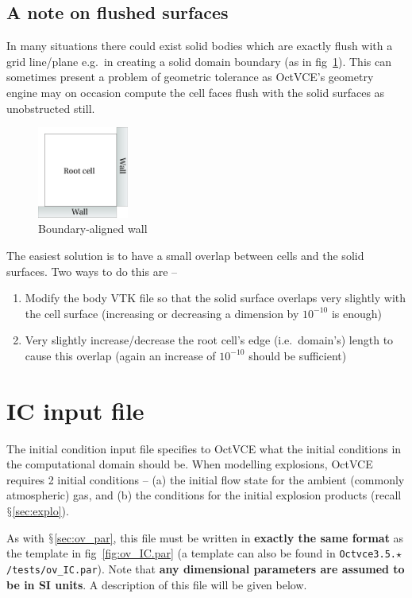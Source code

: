 \documentclass[pdftex, 12pt, a4paper]{report}
\begin{document}
\subsection{A note on flushed surfaces}\label{sec:grid_flush}

In many situations there could exist solid bodies which are exactly flush with a grid line/plane e.g.\ in creating
a solid domain boundary (as in fig~\ref{fig:boundary_wall}).  This can sometimes present a problem of geometric tolerance
as OctVCE's geometry engine may on occasion compute the cell faces flush with the solid surfaces as unobstructed still.

\begin{figure}[htp]
\centering
\includegraphics[width=3cm]{pics/flush_wall.jpg}
\caption{Boundary-aligned wall}
\label{fig:boundary_wall}
\end{figure}

The easiest solution is to have a small overlap between cells and the solid surfaces.  Two ways to do this are -- 
\begin{enumerate}
\item Modify the body VTK file so that the solid surface overlaps very slightly with the cell surface (increasing or
decreasing a dimension by $10^{-10}$ is enough)
\item Very slightly increase/decrease the root cell's edge (i.e.\ domain's) length to cause this overlap (again an increase of
$10^{-10}$ should be sufficient)
\end{enumerate}

\section{IC input file}\label{sec:ov_IC}

The initial condition input file specifies to OctVCE what the initial conditions in the computational domain should be.
When modelling explosions, OctVCE requires 2 initial conditions -- (a) the initial flow state for the ambient (commonly 
atmospheric) gas, and (b) the conditions for the initial explosion products (recall $\mathsection$\ref{sec:explo}).  

As with $\mathsection$\ref{sec:ov_par}, this file must be written in \textbf{exactly the same format} as the 
template in fig~\ref{fig:ov_IC.par} (a template can also be found in \verb'Octvce3.5.'$\star$\verb'/tests/ov_IC.par').
Note that \textbf{any dimensional parameters are assumed to be in SI units}.  A description of this file will be given below.
\end{document}
